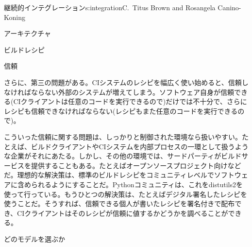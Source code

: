 \begin{aosachapter}{継続的インテグレーション}{s:integration}{C.\ Titus Brown and Rosangela Canino-Koning}
\begin{aosasect1}{アーキテクチャ}
\begin{aosasect2}{ビルドレシピ}
\end{aosasect2}

\begin{aosasect2}{信頼}

さらに、第三の問題がある。CIシステムのレシピを幅広く使い始めると、信頼しなければならない外部のシステムが増えてしまう。ソフトウェア自身が信頼できる(CIクライアントは任意のコードを実行できるので)だけでは不十分で、さらにレシピも信頼できなければならない(レシピもまた任意のコードを実行できるので)。

こういった信頼に関する問題は、しっかりと制御された環境なら扱いやすい。たとえば、ビルドクライアントやCIシステムを内部プロセスの一環として扱うような企業がそれにあたる。しかし、その他の環境では、サードパーティがビルドサービスを提供することもある。たとえばオープンソースプロジェクト向けなどだ。理想的な解決策は、標準のビルドレシピをコミュニティレベルでソフトウェアに含められるようにすることだ。Pythonコミュニティは、これをdistutils2を使って行っている。もうひとつの解決策は、たとえばデジタル署名したレシピを使うことだ。そうすれば、信頼できる個人が書いたレシピを署名付きで配布でき、CIクライアントはそのレシピが信頼に値するかどうかを調べることができる。

\end{aosasect2}

\begin{aosasect2}{どのモデルを選ぶか}


\end{aosasect2}
\end{aosasect1}
\end{aosachapter}
